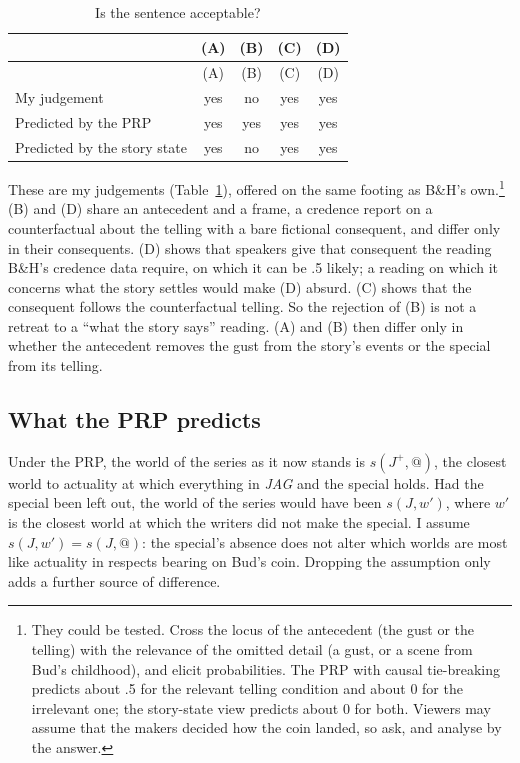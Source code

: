 \documentclass[
  11pt,
  letterpaper,
  DIV=11,
  numbers=noendperiod,
  twoside]{scrartcl}
\begin{document}
\begin{longtable}[]{@{}lcccc@{}}
\caption{Is the sentence acceptable?}\label{tbl-test}\tabularnewline
\toprule\noalign{}
& (A) & (B) & (C) & (D) \\
\midrule\noalign{}
\endfirsthead
\toprule\noalign{}
& (A) & (B) & (C) & (D) \\
\midrule\noalign{}
\endhead
\bottomrule\noalign{}
\endlastfoot
My judgement & yes & no & yes & yes \\
Predicted by the PRP & yes & yes & yes & yes \\
Predicted by the story state & yes & no & yes & yes \\
\end{longtable}

These are my judgements (Table~\ref{tbl-test}), offered on the same
footing as B\&H's own.\footnote{They could be tested. Cross the locus of
  the antecedent (the gust or the telling) with the relevance of the
  omitted detail (a gust, or a scene from Bud's childhood), and elicit
  probabilities. The PRP with causal tie-breaking predicts about .5 for
  the relevant telling condition and about 0 for the irrelevant one; the
  story-state view predicts about 0 for both. Viewers may assume that
  the makers decided how the coin landed, so ask, and analyse by the
  answer.} (B) and (D) share an antecedent and a frame, a credence
report on a counterfactual about the telling with a bare fictional
consequent, and differ only in their consequents. (D) shows that
speakers give that consequent the reading B\&H's credence data require,
on which it can be .5 likely; a reading on which it concerns what the
story settles would make (D) absurd. (C) shows that the consequent
follows the counterfactual telling. So the rejection of (B) is not a
retreat to a ``what the story says'' reading. (A) and (B) then differ
only in whether the antecedent removes the gust from the story's events
or the special from its telling.

\subsection{What the PRP predicts}\label{what-the-prp-predicts}

Under the PRP, the world of the series as it now stands is
\(s(J^{+}, @)\), the closest world to actuality at which everything in
\emph{JAG} and the special holds. Had the special been left out, the
world of the series would have been \(s(J, w')\), where \(w'\) is the
closest world at which the writers did not make the special. I assume
\(s(J, w') = s(J, @)\): the special's absence does not alter which
worlds are most like actuality in respects bearing on Bud's coin.
Dropping the assumption only adds a further source of difference.
\end{document}
